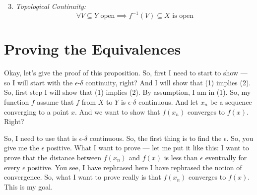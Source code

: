 \begin{math-stroke}
\begin{enumerate}
    \setcounter{enumi}{2} \item \emph{Topological Continuity:}
    \[ \forall V \subseteq Y \text{ open} \implies f^{-1}(V) \subseteq X \text{ is open} \]
\end{enumerate}
\end{math-stroke}

\section{Proving the Equivalences}

\begin{spoken-clean}[00:14:15 - 00:16:35]
Okay, let's give the proof of this proposition. So, first I need to start to show --- so I will start with the $\epsilon$-$\delta$ continuity, right? And I will show that (1) implies (2). So, first step I will show that (1) implies (2). By assumption, I am in (1). So, my function $f$ assume that $f$ from $X$ to $Y$ is $\epsilon$-$\delta$ continuous. And let $x_n$ be a sequence converging to a point $x$. And we want to show that $f(x_n)$ converges to $f(x)$. Right? 

So, I need to use that is $\epsilon$-$\delta$ continuous. So, the first thing is to find the $\epsilon$. So, you give me the $\epsilon$ positive. What I want to prove --- let me put it like this: I want to prove that the distance between $f(x_n)$ and $f(x)$ is less than $\epsilon$ eventually for every $\epsilon$ positive. You see, I have rephrased here I have rephrased the notion of convergence. So, what I want to prove really is that $f(x_n)$ converges to $f(x)$. This is my goal.
\end{spoken-clean}

